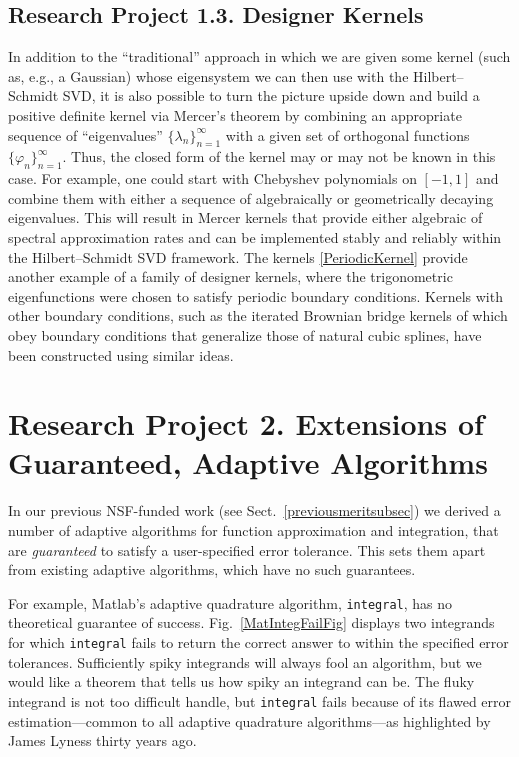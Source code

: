 \documentclass[11pt]{NSFamsart}
\newcommand{\Matlab}{{\sc Matlab}\xspace}
\begin{document}
\subsection*{Research Project 1.3. Designer Kernels}\label{SectDesignerKernels}
In addition to the ``traditional'' approach in which we are given some kernel (such as, e.g., a Gaussian) whose eigensystem we can then use with the Hilbert--Schmidt SVD, it is also possible to turn the picture upside down and build a positive definite kernel via Mercer's theorem by combining an appropriate sequence of
``eigenvalues'' $\{\lambda_n\}_{n=1}^\infty$ with a given set of orthogonal functions $\{\varphi_n\}_{n=1}^\infty$. Thus, the closed form of the kernel may or may not be known in this case. For example, one could start with Chebyshev polynomials on $[-1,1]$ and combine them with either a sequence of algebraically or geometrically decaying eigenvalues. This will result in Mercer kernels that provide either algebraic of spectral approximation rates and can be implemented stably and reliably within the Hilbert--Schmidt SVD framework. The kernels \eqref{PeriodicKernel} provide another example of a family of designer kernels, where the trigonometric eigenfunctions were chosen to satisfy periodic boundary conditions. Kernels with other boundary conditions, such as the iterated Brownian bridge kernels of \cite{CavorettoEtAl14} which obey boundary conditions that generalize those of natural cubic splines, have been constructed using similar ideas.

\section*{Research Project 2. Extensions of Guaranteed, Adaptive Algorithms}\label{SectGAIL}

In our previous NSF-funded work (see Sect.\ \ref{previousmeritsubsec}) we derived a number of  adaptive algorithms for function approximation and integration, that are \emph{guaranteed} to satisfy a user-specified error tolerance.  This sets them apart from existing adaptive algorithms, which have no such guarantees.

For example, \Matlab's adaptive quadrature algorithm, \texttt{integral}, has no theoretical guarantee of success. Fig.\ \ref{MatIntegFailFig} displays two integrands for which \texttt{integral} fails to return the correct answer to within the specified error tolerances.  Sufficiently spiky integrands will always fool an algorithm, but we would like a theorem that tells us how spiky an integrand can be.  The fluky integrand is not too difficult handle, but \texttt{integral} fails because of its flawed error estimation---common to all adaptive quadrature algorithms---as highlighted by James Lyness \cite{Lyn83} thirty years ago.
\end{document}
